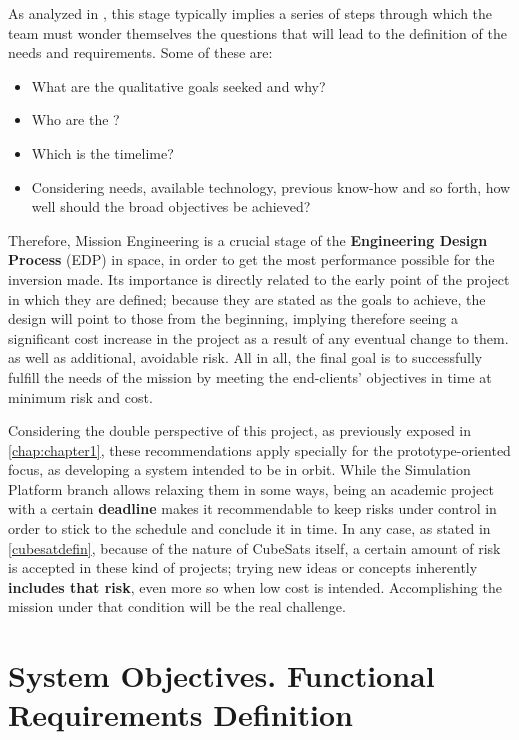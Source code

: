 As analyzed in \cite{smad}, this stage typically implies a series of steps through which the team must wonder themselves the questions that will lead to the definition of the needs and requirements. Some of these are:

\begin{itemize}

	\item{What are the qualitative goals seeked and why?}
	\item{Who are the ?}
	\item{Which is the timelime?}
	\item{Considering needs, available technology, previous know-how and so forth, how well should the broad objectives be achieved?}
	
\end{itemize}

Therefore, Mission Engineering is a crucial stage of the \textbf{Engineering Design Process} (\acrshort{EDP}) in space, in order to get the most performance possible for the inversion made. Its importance is directly related to the early point of the project in which they are defined; because they are stated as the goals to achieve, the design will point to those from the beginning, implying therefore seeing a significant cost increase in the project as a result of any eventual change to them. as well as additional, avoidable risk. All in all, the final goal is to successfully fulfill the needs of the mission by meeting the end-clients' objectives in time at minimum risk and cost.

Considering the double perspective of this project, as previously exposed in \autoref{chap:chapter1}, these recommendations apply specially for the prototype-oriented focus, as developing a system intended to be in orbit. While the Simulation Platform branch allows relaxing them in some ways, being an academic project with a certain \textbf{deadline} makes it recommendable to keep risks under control in order to stick to the schedule and conclude it in time. In any case, as stated in \autoref{cubesatdefin}, because of the nature of CubeSats itself, a certain amount of risk is accepted in these kind of projects; trying new ideas or concepts inherently \textbf{includes that risk}, even more so when low cost is intended. Accomplishing the mission under that condition will be the real challenge.


\section{System Objectives. Functional Requirements Definition}


